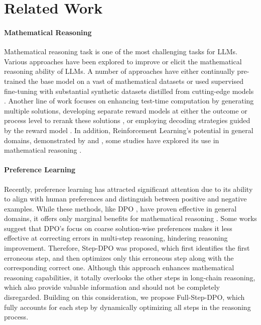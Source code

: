 \section{Related Work}
\paragraph{Mathematical Reasoning}
Mathematical reasoning task is one of the most challenging tasks for LLMs. Various approaches have been explored to improve or elicit the mathematical reasoning ability of LLMs. 
A number of approaches have either continually pre-trained the base model on a vast of mathematical datasets \cite{llemma, deepseekmath} or used supervised fine-tuning with substantial synthetic datasets distilled from cutting-edge models \cite{wizardmath, metamath, orcamath, chatglm}.
Another line of work focuses on enhancing test-time computation by generating multiple solutions, developing separate reward models at either the outcome or process level to rerank these solutions \cite{cobbe2021training, lightman2023let}, or employing decoding strategies guided by the reward model \cite{ovm, xie2024self, mathshepherd, wu2024enhancing}.
In addition, Reinforcement Learning’s potential in general domains, demonstrated by \citet{gpt4} and \citet{llama}, some studies have explored its use in mathematical reasoning \cite{mathshepherd, orcamath, smaug}.



\paragraph{Preference Learning}
Recently, preference learning \cite{kto, mao2024don, mao2024simple} has attracted significant attention due to its ability to align with human preferences and distinguish between positive and negative examples. While these methods, like DPO \cite{dpo}, have proven effective in general domains, it offers only marginal benefits for mathematical reasoning \cite{smaug}. Some works \cite{alistep, cuhkstep} suggest that DPO's focus on coarse solution-wise preferences makes it less effective at correcting errors in multi-step reasoning, hindering reasoning improvement. Therefore, Step-DPO \cite{cuhkstep} was proposed, which first identifies the first erroneous step, and then optimizes only this erroneous step along with the corresponding correct one. Although this approach enhances mathematical reasoning capabilities, it totally overlooks the other steps in long-chain reasoning, which also provide valuable information and should not be completely disregarded. Building on this consideration, we propose Full-Step-DPO, which fully accounts for each step by dynamically optimizing all steps in the reasoning process. 



